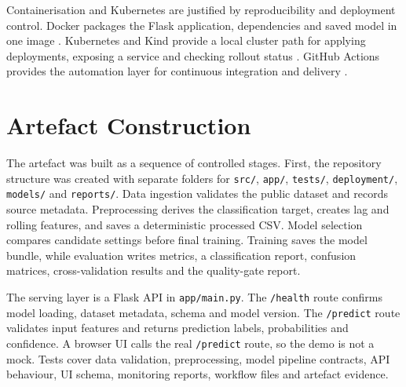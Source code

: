 \documentclass[journal,twoside,web]{ieeecolor}
\begin{document}
Containerisation and Kubernetes are justified by reproducibility and deployment control. Docker packages the Flask application, dependencies and saved model in one image \cite{docker}. Kubernetes and Kind provide a local cluster path for applying deployments, exposing a service and checking rollout status \cite{kubernetes,kind}. GitHub Actions provides the automation layer for continuous integration and delivery \cite{githubactions}.

\section{Artefact Construction}
The artefact was built as a sequence of controlled stages. First, the repository structure was created with separate folders for \texttt{src/}, \texttt{app/}, \texttt{tests/}, \texttt{deployment/}, \texttt{models/} and \texttt{reports/}. Data ingestion validates the public dataset and records source metadata. Preprocessing derives the classification target, creates lag and rolling features, and saves a deterministic processed CSV. Model selection compares candidate settings before final training. Training saves the model bundle, while evaluation writes metrics, a classification report, confusion matrices, cross-validation results and the quality-gate report.

The serving layer is a Flask API in \texttt{app/main.py}. The \texttt{/health} route confirms model loading, dataset metadata, schema and model version. The \texttt{/predict} route validates input features and returns prediction labels, probabilities and confidence. A browser UI calls the real \texttt{/predict} route, so the demo is not a mock. Tests cover data validation, preprocessing, model pipeline contracts, API behaviour, UI schema, monitoring reports, workflow files and artefact evidence.
\end{document}
